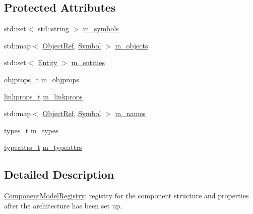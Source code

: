 \subsection*{Protected Attributes}
\begin{DoxyCompactItemize}
\item 
std\+::set$<$ std\+::string $>$ \hyperlink{class_component_model_registry_ab66f9920fac78cc986138541f0de8383}{m\+\_\+symbols}
\item 
std\+::map$<$ \hyperlink{class_component_model_registry_a315c966cec3143524c002daa7301b054}{Object\+Ref}, \hyperlink{class_component_model_registry_a76ae77a9f2c8f03598f7c45e3450cc49}{Symbol} $>$ \hyperlink{class_component_model_registry_ae0e32b8bfee83babf0d403c6e3b64f36}{m\+\_\+objects}
\item 
std\+::set$<$ \hyperlink{struct_component_model_registry_1_1_entity}{Entity} $>$ \hyperlink{class_component_model_registry_a2987c2cf0fccf7c4c32beee980548f50}{m\+\_\+entities}
\item 
\hyperlink{class_component_model_registry_af0083198a2d84ecf7d7d668e5b3e4660}{objprops\+\_\+t} \hyperlink{class_component_model_registry_a6fb1e8e4fdcc3dd78909affc77fbad56}{m\+\_\+objprops}
\item 
\hyperlink{class_component_model_registry_a05e8f9171449fb800c90abee1a698afb}{linkprops\+\_\+t} \hyperlink{class_component_model_registry_a80e6aac08b0471a248b1c9eb1a903f96}{m\+\_\+linkprops}
\item 
std\+::map$<$ \hyperlink{class_component_model_registry_a315c966cec3143524c002daa7301b054}{Object\+Ref}, \hyperlink{class_component_model_registry_a76ae77a9f2c8f03598f7c45e3450cc49}{Symbol} $>$ \hyperlink{class_component_model_registry_a41c18375b49c196440c14124ef24ec7e}{m\+\_\+names}
\item 
\hyperlink{class_component_model_registry_a8fb4d43b83df65428c1701f659a8acff}{types\+\_\+t} \hyperlink{class_component_model_registry_a306f1c7a15084c47e5b62d1d9854b804}{m\+\_\+types}
\item 
\hyperlink{class_component_model_registry_a901d7abbb42dbbf185d37d0a342e6564}{typeattrs\+\_\+t} \hyperlink{class_component_model_registry_a75b5f9994f8c432af4e951f160896652}{m\+\_\+typeattrs}
\end{DoxyCompactItemize}


\subsection{Detailed Description}
\hyperlink{class_component_model_registry}{Component\+Model\+Registry}\+: registry for the component structure and properties after the architecture has been set up. 

